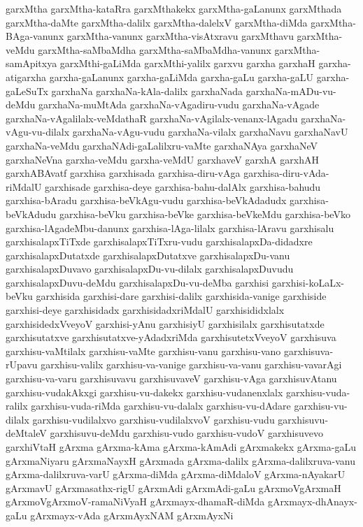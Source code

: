 {garxMtha
garxMtha-kataRra
garxMthakekx
garxMtha-gaLanunx
garxMthada
garxMtha-daMte
garxMtha-dalilx
garxMtha-dalelxV
garxMtha-diMda
garxMtha-BAga-vanunx
garxMtha-vanunx
garxMtha-visAtxravu
garxMthavu
garxMtha-veMdu
garxMtha-saMbaMdha
garxMtha-saMbaMdha-vanunx
garxMtha-samApitxya
garxMthi-gaLiMda
garxMthi-yalilx
garxvu
garxha
garxhaH
garxha-atigarxha
garxha-gaLanunx
garxha-gaLiMda
garxha-gaLu
garxha-gaLU
garxha-gaLeSuTx
garxhaNa
garxhaNa-kAla-dalilx
garxhaNada
garxhaNa-mADu-vu-deMdu
garxhaNa-muMtAda
garxhaNa-vAgadiru-vudu
garxhaNa-vAgade
garxhaNa-vAgalilalx-veMdathaR
garxhaNa-vAgilalx-venanx-lAgadu
garxhaNa-vAgu-vu-dilalx
garxhaNa-vAgu-vudu
garxhaNa-vilalx
garxhaNavu
garxhaNavU
garxhaNa-veMdu
garxhaNAdi-gaLalilxru-vaMte
garxhaNAya
garxhaNeV
garxhaNeVna
garxha-veMdu
garxha-veMdU
garxhaveV
garxhA
garxhAH
garxhABAvatf
garxhisa
garxhisada
garxhisa-diru-vAga
garxhisa-diru-vAda-riMdalU
garxhisade
garxhisa-deye
garxhisa-bahu-dalAlx
garxhisa-bahudu
garxhisa-bAradu
garxhisa-beVkAgu-vudu
garxhisa-beVkAdadudx
garxhisa-beVkAdudu
garxhisa-beVku
garxhisa-beVke
garxhisa-beVkeMdu
garxhisa-beVko
garxhisa-lAgadeMbu-danunx
garxhisa-lAga-lilalx
garxhisa-lAravu
garxhisalu
garxhisalapxTiTxde
garxhisalapxTiTxru-vudu
garxhisalapxDa-didadxre
garxhisalapxDutatxde
garxhisalapxDutatxve
garxhisalapxDu-vanu
garxhisalapxDuvavo
garxhisalapxDu-vu-dilalx
garxhisalapxDuvudu
garxhisalapxDuvu-deMdu
garxhisalapxDu-vu-deMba
garxhisi
garxhisi-koLaLx-beVku
garxhisida
garxhisi-dare
garxhisi-dalilx
garxhisida-vanige
garxhiside
garxhisi-deye
garxhisidadx
garxhisidadxriMdalU
garxhisididxlalx
garxhisidedxVveyoV
garxhisi-yAnu
garxhisiyU
garxhisilalx
garxhisutatxde
garxhisutatxve
garxhisutatxve-yAdadxriMda
garxhisutetxVveyoV
garxhisuva
garxhisu-vaMtilalx
garxhisu-vaMte
garxhisu-vanu
garxhisu-vano
garxhisuva-rUpavu
garxhisu-valilx
garxhisu-va-vanige
garxhisu-va-vanu
garxhisu-vavarAgi
garxhisu-va-varu
garxhisuvavu
garxhisuvaveV
garxhisu-vAga
garxhisuvAtanu
garxhisu-vudakAkxgi
garxhisu-vu-dakekx
garxhisu-vudanenxlalx
garxhisu-vuda-ralilx
garxhisu-vuda-riMda
garxhisu-vu-dalalx
garxhisu-vu-dAdare
garxhisu-vu-dilalx
garxhisu-vudilalxvo
garxhisu-vudilalxvoV
garxhisu-vudu
garxhisuvu-deMtaleV
garxhisuvu-deMdu
garxhisu-vudo
garxhisu-vudoV
garxhisuvevo
garxhiVtaH
gArxma
gArxma-kAma
gArxma-kAmAdi
gArxmakekx
gArxma-gaLu
gArxmaNiyaru
gArxmaNayxH
gArxmada
gArxma-dalilx
gArxma-dalilxruva-vanu
gArxma-dalilxruva-varU
gArxma-diMda
gArxma-diMdaloV
gArxma-nAyakarU
gArxmavU
gArxmasathx-rigU
gArxmAdi
gArxmAdi-gaLu
gArxmoVgArxmaH
gArxmoVgArxmoV-ramaNiVyaH
gArxmayx-dhamaR-diMda
gArxmayx-dhAnayx-gaLu
gArxmayx-vAda
gArxmAyxNAM
gArxmAyxNi
}

